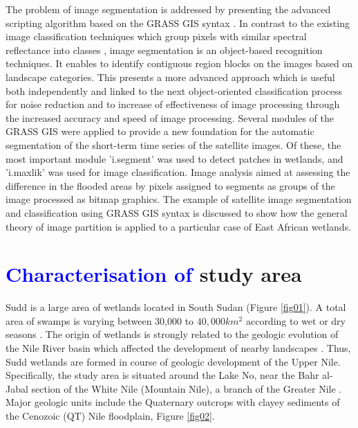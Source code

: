 \documentclass[analytics,article,submit,pdftex,moreauthors]{Definitions/mdpi}
\begin{document}
The problem of image segmentation is addressed by presenting the advanced scripting algorithm based on the GRASS GIS syntax \cite{Lemenkova202125,jmse11040871,HOFIERKA2009387,technologies11020046}. In contrast to the existing image classification techniques which group pixels with similar spectral reflectance into classes \cite{DIVITTORIO20181,info14040249,Campos,Lemenkova202229}, image segmentation is an object-based recognition techniques. It enables to identify contiguous region blocks on the images based on landscape categories. This presents a more advanced approach which is useful both independently and linked to the next object-oriented classification process for noise reduction and to increase of effectiveness of image processing through the increased accuracy and speed of image processing. Several modules of the GRASS GIS were applied to provide a new foundation for the automatic segmentation of the short-term time series of the satellite images. Of these, the most important module 'i.segment' was used to detect patches in wetlands, and 'i.maxlik' was used for image classification. Image analysis aimed at assessing the difference in the flooded areas by pixels assigned to segments as groups of the image processed as bitmap graphics. The example of satellite image segmentation and classification using GRASS GIS syntax is discussed to show how the general theory of image partition is applied to a particular case of East African wetlands.

\section{\textcolor{blue}{Characterisation of} study area}

Sudd is a large area of wetlands located in South Sudan (Figure \ref{fig01}). A total area of swamps is varying between 30,000 to $40,000 km^2$ according to wet or dry seasons \cite{MohamedSavenije}. The origin of wetlands is strongly related to the geologic evolution of the Nile River basin which affected the development of nearby landscapes \cite{Adamson}. Thus, Sudd wetlands are formed in course of geologic development of the Upper Nile. Specifically, the study area is situated around the Lake No, near the Bahr al-Jabal section of the White Nile (Mountain Nile), a branch of the Greater Nile \cite{Broun}. Major geologic units include the Quaternary outcrops with clayey sediments of the Cenozoic (QT) Nile floodplain, Figure \ref{fig02}.  
\end{document}
